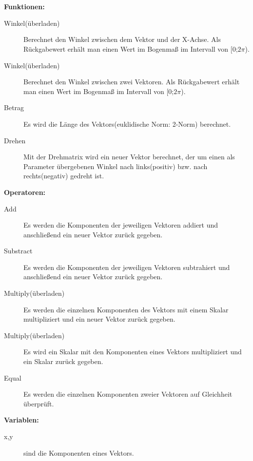 \\\\
\textbf{Funktionen:}
\begin{description}
	\item[Winkel(überladen)] Berechnet den Winkel zwischen dem Vektor und der X-Achse. Als Rückgabewert erhält man einen Wert im Bogenmaß im Intervall von [0;$2\pi$).
	\item[Winkel(überladen)] Berechnet den Winkel zwischen zwei Vektoren. Als Rückgabewert erhält man einen Wert im Bogenmaß im Intervall von [0;$2\pi$). 
	\item[Betrag] Es wird die Länge des Vektors(euklidische Norm: 2-Norm) berechnet.
	\item[Drehen] Mit der Drehmatrix wird ein neuer Vektor berechnet, der um einen als Parameter übergebenen Winkel nach links(positiv) bzw. nach rechts(negativ) gedreht ist. \\
\end{description}
\textbf{Operatoren:}
\begin{description}
	\item[Add] Es werden die Komponenten der jeweiligen Vektoren addiert und anschließend ein neuer Vektor zurück gegeben.
	\item[Substract] Es werden die Komponenten der jeweiligen Vektoren subtrahiert und anschließend ein neuer Vektor zurück gegeben.
	\item[Multiply(überladen)] Es werden die einzelnen Komponenten des Vektors mit einem Skalar multipliziert und ein neuer Vektor zurück gegeben.
	\item[Multiply(überladen)] Es wird ein Skalar mit den Komponenten eines Vektors multipliziert und ein Skalar zurück gegeben.
	\item[Equal] Es werden die einzelnen Komponenten zweier Vektoren auf Gleichheit überprüft.\\
\end{description}
\textbf{Variablen:}
\begin{description}
	\item[x,y] sind die Komponenten eines Vektors.
\end{description}